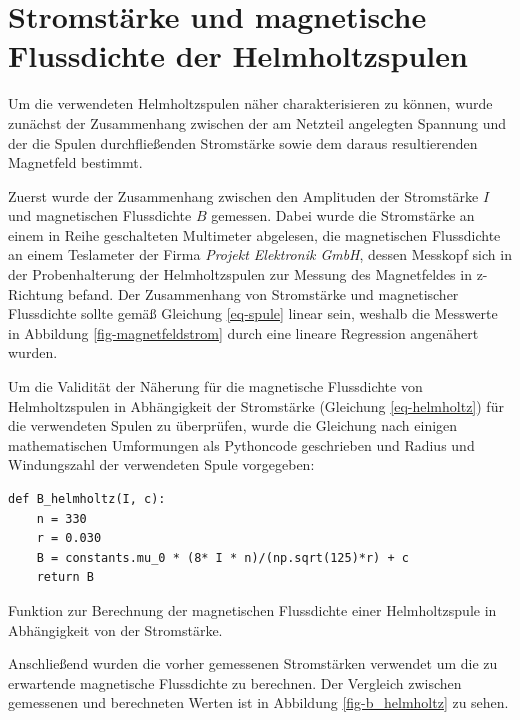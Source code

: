 \documentclass[page,pdftex,12pt,a4paper,twoside,openright]{scrbook}
\begin{document}
\section{Stromstärke und magnetische Flussdichte der Helmholtzspulen \label{sec-b_helmholtz}}
\label{sec:org184112d}
Um die verwendeten Helmholtzspulen näher charakterisieren zu können, wurde zunächst der Zusammenhang zwischen der am Netzteil angelegten Spannung und der die Spulen durchfließenden Stromstärke sowie dem daraus resultierenden Magnetfeld bestimmt.

Zuerst wurde der Zusammenhang zwischen den Amplituden der Stromstärke \(I\) und magnetischen Flussdichte \(B\) gemessen. Dabei wurde die Stromstärke an einem in Reihe geschalteten Multimeter abgelesen, die magnetischen Flussdichte an einem Teslameter der Firma \emph{Projekt Elektronik GmbH}, dessen Messkopf sich in der Probenhalterung der Helmholtzspulen zur Messung des Magnetfeldes in z-Richtung befand. Der Zusammenhang von Stromstärke und magnetischer Flussdichte sollte gemäß Gleichung \ref{eq-spule} linear sein, weshalb die Messwerte in Abbildung \ref{fig-magnetfeldstrom} durch eine lineare Regression angenähert wurden.

Um die Validität der Näherung für die magnetische Flussdichte von Helmholtzspulen in Abhängigkeit der Stromstärke (Gleichung \ref{eq-helmholtz}) für die verwendeten Spulen zu überprüfen, wurde die Gleichung nach einigen mathematischen Umformungen als Pythoncode geschrieben und Radius und Windungszahl der verwendeten Spule vorgegeben:

\begin{listing}[htbp]
\begin{verbatim}
def B_helmholtz(I, c):
    n = 330
    r = 0.030
    B = constants.mu_0 * (8* I * n)/(np.sqrt(125)*r) + c
    return B
\end{verbatim}
\caption{Funktion zur Berechnung der magnetischen Flussdichte einer Helmholtzspule in Abhängigkeit von der Stromstärke.}
\end{listing}

Anschließend wurden die vorher gemessenen Stromstärken verwendet um die zu erwartende magnetische Flussdichte zu berechnen. Der Vergleich zwischen gemessenen und berechneten Werten ist in Abbildung \ref{fig-b_helmholtz} zu sehen.
\end{document}
